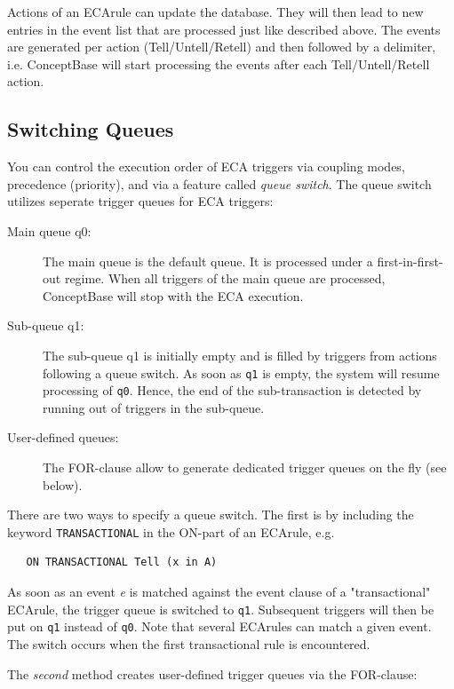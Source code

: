 Actions of an ECArule can update the database. They will then lead to
new entries in the event list that are processed just like described above. The events are
generated per action (Tell/Untell/Retell) and then followed by a delimiter, i.e. ConceptBase will
start processing the events after each Tell/Untell/Retell action. 


\subsection{Switching Queues}

You can control the execution order of ECA triggers via coupling modes, precedence (priority),
and via a feature called {\em queue switch}. The queue switch
utilizes seperate trigger queues for ECA triggers:

\begin{description}
\item[Main queue q0:] The main queue is the default queue. It is processed 
under a first-in-first-out regime. When all triggers of the main queue are
processed, ConceptBase will stop with the ECA execution.
\item[Sub-queue q1:] The sub-queue q1 is initially empty and is  filled by
triggers from actions following a queue switch.
As soon as {\tt q1} is empty, the system will
resume processing of {\tt q0}. Hence, the end of the sub-transaction is
detected by running out of triggers in the sub-queue.
\item[User-defined queues:] The FOR-clause allow to generate dedicated
trigger queues on the fly (see below).
\end{description}

There are two ways to specify a queue switch. The first is by including the
keyword {\tt TRANS\-ACTIO\-NAL} in the ON-part of an ECArule, e.g.\

{\small
\begin{verbatim}
   ON TRANSACTIONAL Tell (x in A) 
\end{verbatim}
}

As soon as an event {\it e\/} is matched against the event clause of a "transactional" ECArule,
the trigger queue is switched to {\tt q1}. Subsequent triggers will then be put on {\tt q1}
instead of {\tt q0}. Note that several ECArules can match a given event. The switch 
occurs when the first transactional rule is encountered.

The {\em second\/} method creates user-defined trigger queues via the FOR-clause:

